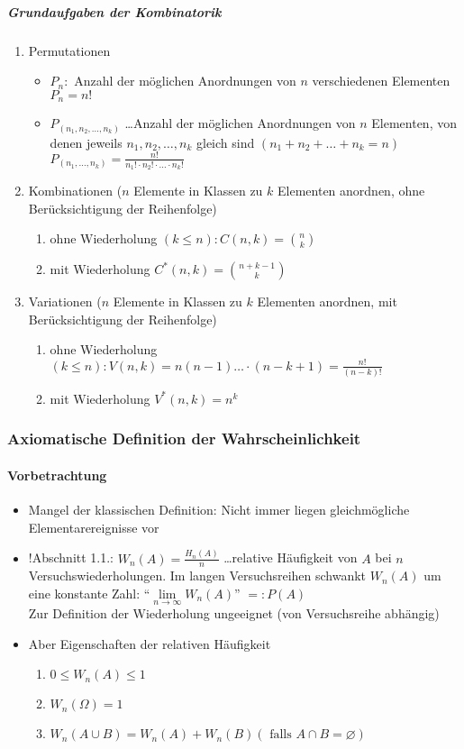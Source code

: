 \documentclass[a4paper]{scrartcl}
\begin{document}
\subparagraph{Grundaufgaben der Kombinatorik}
\begin{enumerate}
\item Permutationen
\begin{itemize}
\item $P_n:$ Anzahl der möglichen Anordnungen von $n$ verschiedenen Elementen $P_n = n!$
\item $P_{(n_1,n_2,\dots,n_k)}$ \dots Anzahl der möglichen Anordnungen von $n$ Elementen, von denen jeweils $n_1,n_2,\dots,n_k$ gleich sind $(n_1+n_2+\dots+n_k = n )$\\
$P_{(n_1,\dots,n_k)} = \frac{n!}{n_1 !  \cdot n_2 ! \cdot \dots \cdot n_k ! }$
\end{itemize}
\item Kombinationen ($n$ Elemente in Klassen zu $k$ Elementen anordnen, ohne Berücksichtigung der Reihenfolge)
\begin{enumerate}
\item ohne Wiederholung $(k \leq n) : C(n,k) = \binom{n}{k}$
\item mit Wiederholung $C^* (n,k) = \binom{n+k-1}{k}$
\end{enumerate}
\item Variationen ($n$ Elemente in Klassen zu $k$ Elementen anordnen, mit Berücksichtigung der Reihenfolge)
\begin{enumerate}
\item ohne Wiederholung $(k \leq n) : V(n,k) = n (n-1) \dots  \cdot (n-k+1) = \frac{n!}{(n-k)!}$
\item mit Wiederholung $V^* (n,k) = n^k$
\end{enumerate}

\end{enumerate}

\subsubsection{Axiomatische Definition der Wahrscheinlichkeit}
\paragraph{Vorbetrachtung}
\begin{itemize}
\item Mangel der klassischen Definition: Nicht immer liegen gleichmögliche Elementarereignisse vor
\item !Abschnitt 1.1.: $W_n (A) = \frac{H_n (A)}{n}$ \dots relative Häufigkeit von $A$ bei $n$ Versuchswiederholungen. Im langen Versuchsreihen schwankt $W_n (A) $ um eine konstante Zahl: "`$ \lim\limits_{n \to \infty} W_n (A)$"' $=: P(A)$\\
Zur Definition der Wiederholung ungeeignet (von Versuchsreihe abhängig)
\item Aber Eigenschaften der relativen Häufigkeit
\begin{enumerate}
\item $0 \leq W_n(A) \leq 1$
\item $W_n(\Omega) = 1$
\item $W_n (A \cup B) = W_n(A) + W_n(B) (\text{ falls } A \cap B = \varnothing)$
\end{enumerate}
\end{itemize}
\end{document}
